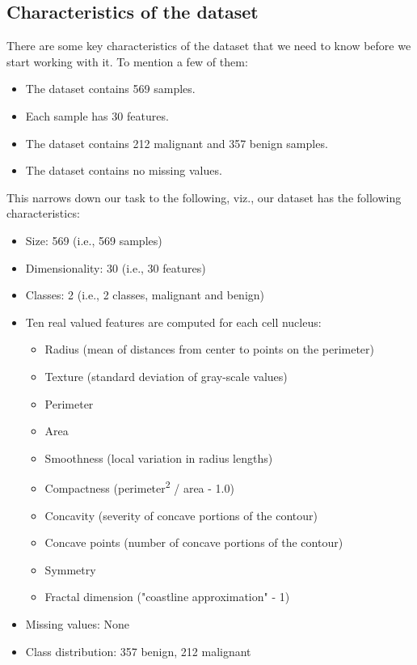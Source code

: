 \subsection{Characteristics of the dataset}
There are some key characteristics of the dataset that we need to know before we start working with it.
To mention a few of them:
\begin{itemize}
    \item The dataset contains 569 samples.
    \item Each sample has 30 features.
    \item The dataset contains 212 malignant and 357 benign samples.
    \item The dataset contains no missing values.
\end{itemize}
This narrows down our task to the following, viz., our dataset has the following characteristics:
\begin{itemize}
    \item Size: 569 (i.e., 569 samples)
    \item Dimensionality: 30 (i.e., 30 features)
    \item Classes: 2 (i.e., 2 classes, malignant and benign)
    \item Ten real valued features are computed for each cell nucleus:
    \begin{itemize}
        \item Radius (mean of distances from center to points on the perimeter)
        \item Texture (standard deviation of gray-scale values)
        \item Perimeter
        \item Area
        \item Smoothness (local variation in radius lengths)
        \item Compactness (perimeter\textsuperscript{2} / area - 1.0)
        \item Concavity (severity of concave portions of the contour)
        \item Concave points (number of concave portions of the contour)
        \item Symmetry
        \item Fractal dimension ("coastline approximation" - 1)
    \end{itemize}
    \item Missing values: None
    \item Class distribution: 357 benign, 212 malignant
\end{itemize}
